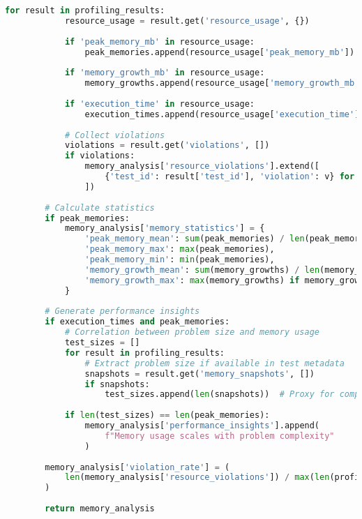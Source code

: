 \begin{lstlisting}[language=Python, caption=Memory Profiling and Resource Monitoring for Testing]
        for result in profiling_results:
            resource_usage = result.get('resource_usage', {})
            
            if 'peak_memory_mb' in resource_usage:
                peak_memories.append(resource_usage['peak_memory_mb'])
            
            if 'memory_growth_mb' in resource_usage:
                memory_growths.append(resource_usage['memory_growth_mb'])
            
            if 'execution_time' in resource_usage:
                execution_times.append(resource_usage['execution_time'])
            
            # Collect violations
            violations = result.get('violations', [])
            if violations:
                memory_analysis['resource_violations'].extend([
                    {'test_id': result['test_id'], 'violation': v} for v in violations
                ])
        
        # Calculate statistics
        if peak_memories:
            memory_analysis['memory_statistics'] = {
                'peak_memory_mean': sum(peak_memories) / len(peak_memories),
                'peak_memory_max': max(peak_memories),
                'peak_memory_min': min(peak_memories),
                'memory_growth_mean': sum(memory_growths) / len(memory_growths) if memory_growths else 0,
                'memory_growth_max': max(memory_growths) if memory_growths else 0
            }
        
        # Generate performance insights
        if execution_times and peak_memories:
            # Correlation between problem size and memory usage
            test_sizes = []
            for result in profiling_results:
                # Extract problem size if available in test metadata
                snapshots = result.get('memory_snapshots', [])
                if snapshots:
                    test_sizes.append(len(snapshots))  # Proxy for complexity
            
            if len(test_sizes) == len(peak_memories):
                memory_analysis['performance_insights'].append(
                    f"Memory usage scales with problem complexity"
                )
        
        memory_analysis['violation_rate'] = (
            len(memory_analysis['resource_violations']) / max(len(profiling_results), 1)
        )
        
        return memory_analysis
\end{lstlisting}